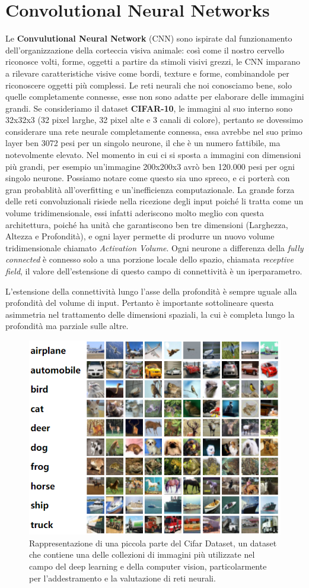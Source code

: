 \chapter{Convolutional Neural Networks}

Le \textbf{Convulutional Neural Network} (CNN) sono ispirate dal funzionamento dell'organizzazione della corteccia visiva animale: così come il nostro cervello riconosce volti, forme, oggetti a partire da stimoli visivi grezzi, le CNN imparano a rilevare caratteristiche visive come bordi, texture e forme, combinandole per riconoscere oggetti più complessi. Le reti neurali che noi conosciamo bene, solo quelle completamente connesse, esse non sono adatte per elaborare delle immagini grandi. Se consideriamo il dataset \textbf{CIFAR-10}, le immagini al suo interno sono 32x32x3 (32 pixel larghe, 32 pixel alte e 3 canali di colore), pertanto se dovessimo considerare una rete neurale completamente connessa, essa avrebbe nel suo primo layer ben 3072 pesi per un singolo neurone, il che è un numero fattibile, ma notevolmente elevato. Nel momento in cui ci si sposta a immagini con dimensioni più grandi, per esempio un'immagine 200x200x3 avrò ben 120.000 pesi per ogni singolo neurone. Possiamo notare come questo sia uno spreco, e ci porterà con gran probablità all'overfitting e un'inefficienza computazionale. La grande forza delle reti convoluzionali risiede nella ricezione degli input poiché li tratta come un volume tridimensionale, essi infatti aderiscono molto meglio con questa architettura, poiché ha unità che garantiscono ben tre dimensioni (Larghezza, Altezza e Profondità), e ogni layer permette di produrre un nuovo volume tridimensionale chiamato \textit{Activation Volume}. Ogni neurone a differenza della \textit{fully connected} è connesso solo a una porzione locale dello spazio, chiamata \textit{receptive field}, il valore dell'estensione di questo campo di connettività è un iperparametro.
\begin{Osservazione}
    L'estensione della connettività lungo l'asse della profondità è sempre uguale alla profondità del volume di input. Pertanto è importante sottolineare questa asimmetria nel trattamento delle dimensioni spaziali, la cui è completa lungo la profondità ma parziale sulle altre.
\end{Osservazione}

\begin{figure}
    \centering
    \includegraphics[width=0.40\linewidth]{figure/Cifar_dataset.png}
    \caption{Rappresentazione di una piccola parte del Cifar Dataset, un dataset che contiene una delle collezioni di immagini più utilizzate nel campo del deep learning e della computer vision, particolarmente per l’addestramento e la valutazione di reti neurali.}
    \label{fig:cifar_ds}
\end{figure}

